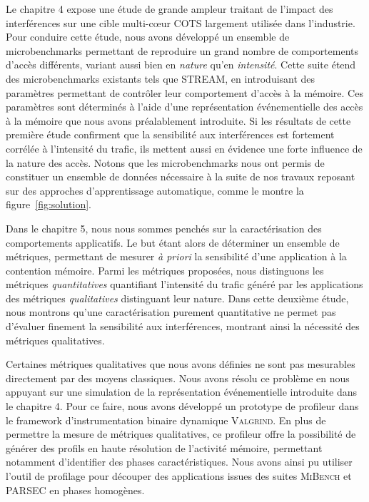 Le chapitre 4 expose une étude de grande ampleur traitant de l'impact des interférences sur une cible multi-cœur COTS largement utilisée dans l'industrie.
Pour conduire cette étude, nous avons développé un ensemble de microbenchmarks permettant de reproduire un grand nombre de comportements d'accès différents, variant aussi bien en \emph{nature} qu'en \emph{intensité}.
Cette suite étend des microbenchmarks existants tels que \textsc{STREAM}, en introduisant des paramètres permettant de contrôler leur comportement d'accès à la mémoire.
Ces paramètres sont déterminés à l'aide d'une  représentation événementielle des accès à la mémoire que nous avons préalablement introduite.
Si les résultats de cette première étude confirment que la sensibilité aux interférences est fortement corrélée à l'intensité du trafic, ils mettent aussi en évidence une forte influence de la nature des accès.
Notons que les microbenchmarks nous ont permis de constituer un ensemble de données nécessaire à la suite de nos travaux reposant sur des approches d'apprentissage automatique, comme le montre la figure~\ref{fig:solution}.

Dans le chapitre 5, nous nous sommes penchés sur la caractérisation des comportements applicatifs.
Le but étant alors de déterminer un ensemble de métriques, permettant de mesurer \emph{à priori} la sensibilité d'une application à la contention mémoire.
Parmi les métriques proposées, nous distinguons les métriques \emph{quantitatives} quantifiant l'intensité du trafic généré par les applications des métriques \emph{qualitatives} distinguant leur nature.
Dans cette deuxième étude, nous montrons qu'une caractérisation purement quantitative ne permet pas d'évaluer finement la sensibilité aux interférences, montrant ainsi la nécessité des métriques qualitatives.

Certaines métriques qualitatives que nous avons définies ne sont pas mesurables directement par des moyens classiques.
Nous avons résolu ce problème en nous appuyant sur une simulation de la représentation événementielle introduite dans le chapitre 4.
Pour ce faire, nous avons développé un prototype de profileur dans le framework d'instrumentation binaire dynamique \textsc{Valgrind}.
En plus de permettre la mesure de métriques qualitatives, ce profileur offre la possibilité de générer des profils en haute résolution de l'activité mémoire, permettant notamment d'identifier des phases caractéristiques.
Nous avons ainsi pu utiliser l'outil de profilage pour découper des applications issues des suites \textsc{MiBench} et \textsc{PARSEC}  en phases homogènes. %

